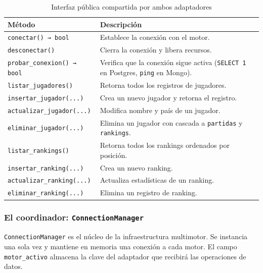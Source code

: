 \documentclass[12pt,letterpaper]{article}
\begin{document}
\begin{table}[H]
  \centering
  \caption{Interfaz pública compartida por ambos adaptadores}
  \begin{tabularx}{\textwidth}{lX}
    \toprule
    \textbf{Método} & \textbf{Descripción} \\
    \midrule
    \texttt{conectar() → bool}         & Establece la conexión con el motor. \\
    \texttt{desconectar()}             & Cierra la conexión y libera recursos. \\
    \texttt{probar\_conexion() → bool} & Verifica que la conexión sigue activa
                                         (\texttt{SELECT 1} en Postgres, \texttt{ping}
                                         en Mongo). \\
    \texttt{listar\_jugadores()}       & Retorna todos los registros de jugadores. \\
    \texttt{insertar\_jugador(...)}    & Crea un nuevo jugador y retorna el registro. \\
    \texttt{actualizar\_jugador(...)}  & Modifica nombre y país de un jugador. \\
    \texttt{eliminar\_jugador(...)}    & Elimina un jugador con cascada a \texttt{partidas}
                                         y \texttt{rankings}. \\
    \texttt{listar\_rankings()}        & Retorna todos los rankings ordenados por posición. \\
    \texttt{insertar\_ranking(...)}    & Crea un nuevo ranking. \\
    \texttt{actualizar\_ranking(...)}  & Actualiza estadísticas de un ranking. \\
    \texttt{eliminar\_ranking(...)}    & Elimina un registro de ranking. \\
    \bottomrule
  \end{tabularx}
  \label{tab:adapter-interface}
\end{table}

\subsubsection{El coordinador: \texttt{ConnectionManager}}

\texttt{ConnectionManager} es el núcleo de la infraestructura multimotor. Se instancia
una sola vez y mantiene en memoria una conexión a cada motor. El campo \texttt{motor\_activo}
almacena la clave del adaptador que recibirá las operaciones de datos.
\end{document}
